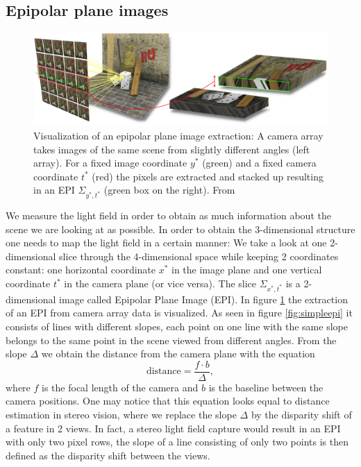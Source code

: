 \documentclass  [
  paper    = a4,
  BCOR     = 10mm,
  twoside,
  fontsize = 12pt,
  fleqn,
  toc      = bibnumbered,
  toc      = listofnumbered,
  numbers  = noendperiod,
  headings = normal,
  listof   = leveldown,
  version  = 3.03
]                                       {scrreprt}
\begin{document}
\subsection{Epipolar plane images}
\label{sec:epi}
\begin{figure}[h!]
	\centering
	\includegraphics[width=1\linewidth]{images/epiVisualization}
	\caption[Visualization of an EPI extraction]{Visualization of an epipolar plane image extraction: A camera array takes images of the same scene from slightly different angles (left array). For a fixed image coordinate $y^*$ (green) and a fixed camera coordinate $t^*$ (red) the pixels are extracted and stacked up resulting in an EPI $\Sigma_{y^*, t^*}$ (green box on the right). From \cite{iwr.uni-heidelberg.de} }
	\label{fig:epivisualization}
\end{figure}
We measure the light field in order to obtain as much information about the scene we are looking at as possible. In order to obtain the 3-dimensional structure one needs to map the light field in a certain manner: We take a look at one 2-dimensional slice through the 4-dimensional space while keeping 2 coordinates constant: one horizontal coordinate  $x^{*}$  in the image plane and one vertical coordinate $t^{*}$ in the camera plane (or vice versa). The slice $\Sigma_{x^{*}, t^{*}}$ is a 2-dimensional image called Epipolar Plane Image (EPI). In figure \ref{fig:epivisualization} the extraction of an EPI from camera array data is visualized. As seen in figure \ref{fig:simpleepi} it consists of lines with different slopes, each point on one line with the same slope belongs to the same point in the scene viewed from different angles. From the slope $\Delta$ we obtain the distance from the camera plane with the equation
\begin{equation}\label{eq:distance}
\text{distance} = \frac{f\cdot b}{\Delta},
\end{equation}
where $f$ is the focal length of the camera and $b$ is the baseline between the camera positions. One may notice that this equation looks equal to distance estimation in stereo vision, where we replace the slope $\Delta$ by the disparity shift of a feature in 2 views. In fact, a stereo light field capture would result in an EPI with only two pixel rows, the slope of a line consisting of only two points is then defined as the disparity shift between the views.
\end{document}
